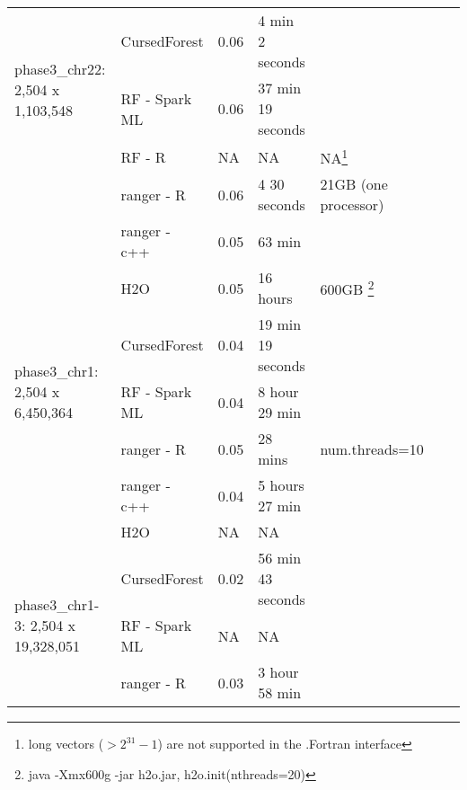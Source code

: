 \documentclass[11pt]{article}
\newcommand{\cursedforest}{{\sc CursedForest}}
\begin{document}
\begin{sidewaystable}[!ht]
\begin{minipage}{\textwidth}
\begin{tabular}{|l|l|l|l|l|l|p{1cm}|}
 \hline
\multirow{3}{*}{phase3\_chr22: 2,504 x 1,103,548}   & \cursedforest & 0.06 & 4 min 2 seconds & \\  %
						  & RF - Spark ML   & 0.06 & 37 min 19 seconds  & \\  %
                                                    & RF - R        & NA         & NA               & NA\footnote{long vectors ($> 2^31-1$)  are not supported in the .Fortran interface} \\ %
                                                    & ranger - R    & 0.06       & 4 30 seconds       & 21GB (one processor) \\ %
                                                    & ranger - c++ & 0.05  & 63 min &   \\
			                           & H2O           & 0.05       & 16 hours         & 600GB \footnote{java -Xmx600g -jar h2o.jar,   h2o.init(nthreads=20)} \\  %
\hline
\multirow{3}{*}{phase3\_chr1: 2,504 x 6,450,364}    & \cursedforest & 0.04  & 19 min 19 seconds &        \\ %
                                                    & RF - Spark ML  &  0.04       & 8 hour 29 min   &     \\ %
                                                   & ranger - R      & 0.05       & 28 mins          & num.threads=10 \\ %
                                                   & ranger - c++ & 0.04 & 5 hours 27 min &  \\
                                                    &H2O & NA & NA &   \\
\hline
\multirow{3}{*}{phase3\_chr1-3: 2,504 x 19,328,051} & \cursedforest & 0.02  & 56 min 43 seconds     &        \\ %
                                                    & RF - Spark ML  &  NA           &  NA                                                     & \\ %
  						 & ranger - R      & 0.03      &    3 hour 58 min  &   \\ %
						 

\end{tabular}
\end{minipage}
\end{sidewaystable}
\end{document}
